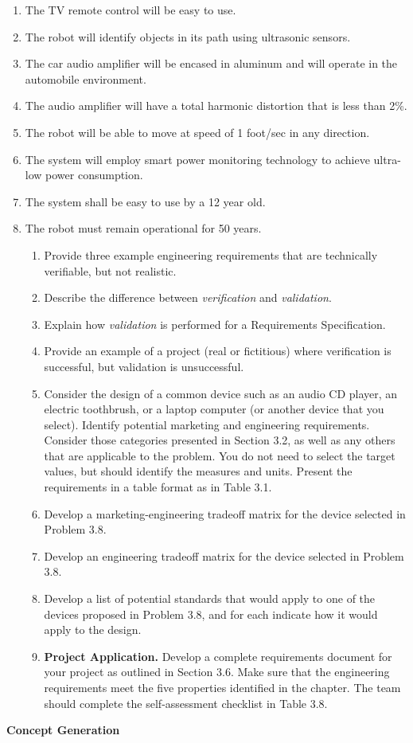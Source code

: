 \begin{enumerate}
\def\labelenumi{\alph{enumi})}
\item
  The TV remote control will be easy to use.
\item
  The robot will identify objects in its path using ultrasonic sensors.
\item
  The car audio amplifier will be encased in aluminum and will operate
  in the automobile environment.
\item
  The audio amplifier will have a total harmonic distortion that is less
  than 2\%.
\item
  The robot will be able to move at speed of 1 foot/sec in any
  direction.
\item
  The system will employ smart power monitoring technology to achieve
  ultra-low power consumption.
\item
  The system shall be easy to use by a 12 year old.
\item
  The robot must remain operational for 50 years.

  \begin{enumerate}
  \def\labelenumii{\arabic{enumii}.}
  \item
    Provide three example engineering requirements that are technically
    verifiable, but not realistic.
  \item
    Describe the difference between \emph{verification} and
    \emph{validation}.
  \item
    Explain how \emph{validation} is performed for a Requirements
    Specification.
  \item
    Provide an example of a project (real or fictitious) where
    verification is successful, but validation is unsuccessful.
  \item
    Consider the design of a common device such as an audio CD player,
    an electric toothbrush, or a laptop computer (or another device that
    you select). Identify potential marketing and engineering
    requirements. Consider those categories presented in Section 3.2, as
    well as any others that are applicable to the problem. You do not
    need to select the target values, but should identify the measures
    and units. Present the requirements in a table format as in Table
    3.1.
  \item
    Develop a marketing-engineering tradeoff matrix for the device
    selected in Problem 3.8.
  \item
    Develop an engineering tradeoff matrix for the device selected in
    Problem 3.8.
  \item
    Develop a list of potential standards that would apply to one of the
    devices proposed in Problem 3.8, and for each indicate how it would
    apply to the design.
  \item
    \textbf{Project Application.} Develop a complete requirements
    document for your project as outlined in Section 3.6. Make sure that
    the engineering requirements meet the five properties identified in
    the chapter. The team should complete the self-assessment checklist
    in Table 3.8.
  \end{enumerate}
\end{enumerate}

\textbf{Concept Generation}
